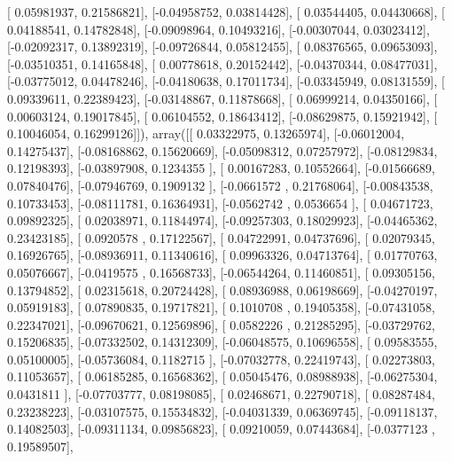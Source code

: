 \documentclass{article}
\begin{document}
       [ 0.05981937,  0.21586821],
       [-0.04958752,  0.03814428],
       [ 0.03544405,  0.04430668],
       [ 0.04188541,  0.14782848],
       [-0.09098964,  0.10493216],
       [-0.00307044,  0.03023412],
       [-0.02092317,  0.13892319],
       [-0.09726844,  0.05812455],
       [ 0.08376565,  0.09653093],
       [-0.03510351,  0.14165848],
       [ 0.00778618,  0.20152442],
       [-0.04370344,  0.08477031],
       [-0.03775012,  0.04478246],
       [-0.04180638,  0.17011734],
       [-0.03345949,  0.08131559],
       [ 0.09339611,  0.22389423],
       [-0.03148867,  0.11878668],
       [ 0.06999214,  0.04350166],
       [ 0.00603124,  0.19017845],
       [ 0.06104552,  0.18643412],
       [-0.08629875,  0.15921942],
       [ 0.10046054,  0.16299126]]), array([[ 0.03322975,  0.13265974],
       [-0.06012004,  0.14275437],
       [-0.08168862,  0.15620669],
       [-0.05098312,  0.07257972],
       [-0.08129834,  0.12198393],
       [-0.03897908,  0.1234355 ],
       [ 0.00167283,  0.10552664],
       [-0.01566689,  0.07840476],
       [-0.07946769,  0.1909132 ],
       [-0.0661572 ,  0.21768064],
       [-0.00843538,  0.10733453],
       [-0.08111781,  0.16364931],
       [-0.0562742 ,  0.0536654 ],
       [ 0.04671723,  0.09892325],
       [ 0.02038971,  0.11844974],
       [-0.09257303,  0.18029923],
       [-0.04465362,  0.23423185],
       [ 0.0920578 ,  0.17122567],
       [ 0.04722991,  0.04737696],
       [ 0.02079345,  0.16926765],
       [-0.08936911,  0.11340616],
       [ 0.09963326,  0.04713764],
       [ 0.01770763,  0.05076667],
       [-0.0419575 ,  0.16568733],
       [-0.06544264,  0.11460851],
       [ 0.09305156,  0.13794852],
       [ 0.02315618,  0.20724428],
       [ 0.08936988,  0.06198669],
       [-0.04270197,  0.05919183],
       [ 0.07890835,  0.19717821],
       [ 0.1010708 ,  0.19405358],
       [-0.07431058,  0.22347021],
       [-0.09670621,  0.12569896],
       [ 0.0582226 ,  0.21285295],
       [-0.03729762,  0.15206835],
       [-0.07332502,  0.14312309],
       [-0.06048575,  0.10696558],
       [ 0.09583555,  0.05100005],
       [-0.05736084,  0.1182715 ],
       [-0.07032778,  0.22419743],
       [ 0.02273803,  0.11053657],
       [ 0.06185285,  0.16568362],
       [ 0.05045476,  0.08988938],
       [-0.06275304,  0.0431811 ],
       [-0.07703777,  0.08198085],
       [ 0.02468671,  0.22790718],
       [ 0.08287484,  0.23238223],
       [-0.03107575,  0.15534832],
       [-0.04031339,  0.06369745],
       [-0.09118137,  0.14082503],
       [-0.09311134,  0.09856823],
       [ 0.09210059,  0.07443684],
       [-0.0377123 ,  0.19589507],
\end{document}
